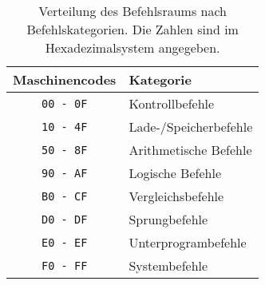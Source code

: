 \begin{table}
  \centering
  \begin{tabular}{|c|l|}                        \hline
    Maschinencodes   & Kategorie              \\\hline\hline
    \texttt{00 - 0F} & Kontrollbefehle        \\
    \texttt{10 - 4F} & Lade-/Speicherbefehle  \\
    \texttt{50 - 8F} & Arithmetische Befehle  \\
    \texttt{90 - AF} & Logische Befehle       \\
    \texttt{B0 - CF} & Vergleichsbefehle      \\
    \texttt{D0 - DF} & Sprungbefehle          \\
    \texttt{E0 - EF} & Unterprogrambefehle    \\
    \texttt{F0 - FF} & Systembefehle          \\\hline
  \end{tabular}
  \caption[Verteilung des Befehlsraums]
          {Verteilung des Befehlsraums nach Befehlskategorien.
          Die Zahlen sind im Hexadezimalsystem angegeben.}
  \label{tab:Befehlraumverteilung}
\end{table}


